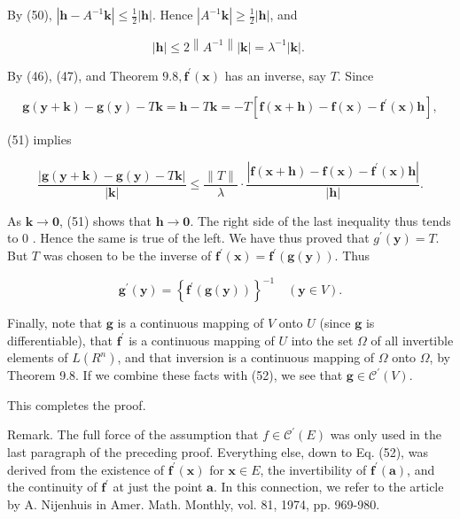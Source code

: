 \documentclass[10pt]{article}
\begin{document}
By (50), $\left|\mathbf{h}-A^{-1} \mathbf{k}\right| \leq \frac{1}{2}|\mathbf{h}|$. Hence $\left|A^{-1} \mathbf{k}\right| \geq \frac{1}{2}|\mathbf{h}|$, and

$$
|\mathbf{h}| \leq 2\left\|A^{-1}\right\||\mathbf{k}|=\lambda^{-1}|\mathbf{k}| \text {. }
$$

By (46), (47), and Theorem $9.8, \mathbf{f}^{\prime}(\mathbf{x})$ has an inverse, say $T$. Since

$$
\mathbf{g}(\mathbf{y}+\mathbf{k})-\mathbf{g}(\mathbf{y})-T \mathbf{k}=\mathbf{h}-T \mathbf{k}=-T\left[\mathbf{f}(\mathbf{x}+\mathbf{h})-\mathbf{f}(\mathbf{x})-\mathbf{f}^{\prime}(\mathbf{x}) \mathbf{h}\right],
$$

(51) implies

$$
\frac{|\mathbf{g}(\mathbf{y}+\mathbf{k})-\mathbf{g}(\mathbf{y})-T \mathbf{k}|}{|\mathbf{k}|} \leq \frac{\|T\|}{\lambda} \cdot \frac{\left|\mathbf{f}(\mathbf{x}+\mathbf{h})-\mathbf{f}(\mathbf{x})-\mathbf{f}^{\prime}(\mathbf{x}) \mathbf{h}\right|}{|\mathbf{h}|} .
$$

As $\mathbf{k} \rightarrow \mathbf{0}$, (51) shows that $\mathbf{h} \rightarrow \mathbf{0}$. The right side of the last inequality thus tends to 0 . Hence the same is true of the left. We have thus proved that $g^{\prime}(\mathbf{y})=T$. But $T$ was chosen to be the inverse of $\mathbf{f}^{\prime}(\mathbf{x})=\mathbf{f}^{\prime}(\mathbf{g}(\mathbf{y}))$. Thus

$$
\mathbf{g}^{\prime}(\mathbf{y})=\left\{\mathbf{f}^{\prime}(\mathbf{g}(\mathbf{y}))\right\}^{-1} \quad(\mathbf{y} \in V) .
$$

Finally, note that $\mathbf{g}$ is a continuous mapping of $V$ onto $U$ (since $\mathbf{g}$ is differentiable), that $\mathbf{f}^{\prime}$ is a continuous mapping of $U$ into the set $\Omega$ of all invertible elements of $L\left(R^{n}\right)$, and that inversion is a continuous mapping of $\Omega$ onto $\Omega$, by Theorem 9.8. If we combine these facts with (52), we see that $\mathbf{g} \in \mathscr{C}^{\prime}(V)$.

This completes the proof.

Remark. The full force of the assumption that $f \in \mathscr{C}^{\prime}(E)$ was only used in the last paragraph of the preceding proof. Everything else, down to Eq. (52), was derived from the existence of $\mathbf{f}^{\prime}(\mathbf{x})$ for $\mathbf{x} \in E$, the invertibility of $\mathbf{f}^{\prime}(\mathbf{a})$, and the continuity of $\mathbf{f}^{\prime}$ at just the point $\mathbf{a}$. In this connection, we refer to the article by A. Nijenhuis in Amer. Math. Monthly, vol. 81, 1974, pp. 969-980.
\end{document}
